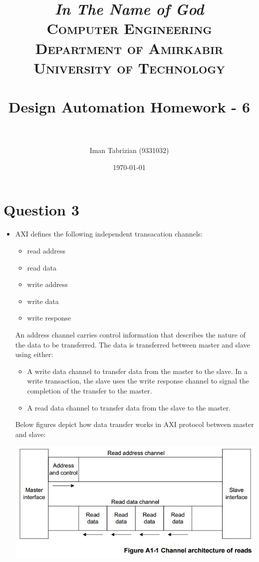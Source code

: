 \documentclass[paper=b4, fontsize=11pt]{scrartcl} %
\title{
\normalfont \normalsize
\textit{In The Name of God} \\ \textsc{Computer Engineering Department of Amirkabir University of Technology} \\ [25pt] \horrule{0.5pt} \\[0.4cm] %
\huge Design Automation Homework - 6 \\ %
\horrule{2pt} \\[0.5cm] %
}
\author{Iman Tabrizian (9331032)}
\date{\normalsize\today}
\numberwithin{equation}{section} %
\numberwithin{figure}{section} %
\numberwithin{table}{section} %
\begin{document}
\maketitle
\section{Question 3}
\begin{itemize}
    \item
        AXI defines the following independent transacation channels:
        \begin{itemize}
            \item
                read address
            \item
                read data
            \item
                write address
            \item
                write data
            \item
                write response

        \end{itemize}

        An address channel carries control information that describes the
        nature of the data to be transferred. The data is transferred between
        master and slave using either:

        \begin{itemize}
            \item
                A write data channel to transfer data from the master to the
                slave. In a write transaction, the slave uses the write response
                channel to signal the completion of the transfer to the master.
            \item
                A read data channel to transfer data from the slave to the
                master.
        \end{itemize}

        Below figures depict how data transfer works in AXI protocol between
        master and slave:
        \begin{center}
            \includegraphics[scale=0.6]{q3/reads.png}
        \end{center}


\end{itemize}
\end{document}
